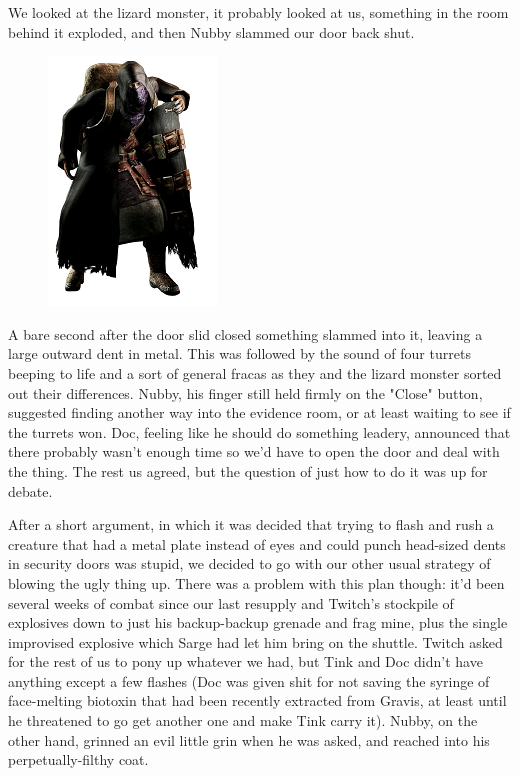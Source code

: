 We looked at the lizard monster, it probably looked at us, something in the room behind it exploded, and then Nubby slammed our door back shut.

\begin{figure}
	\begin{center}
		\includegraphics[width=\figwidth]{pics/16/22.png}
	\end{center}
\end{figure}
A bare second after the door slid closed something slammed into it, leaving a large outward dent in metal. 
This was followed by the sound of four turrets beeping to life and a sort of general fracas as they and the lizard monster sorted out their differences. 
Nubby, his finger still held firmly on the "Close" button, suggested finding another way into the evidence room, or at least waiting to see if the turrets won. 
Doc, feeling like he should do something leadery, announced that there probably wasn't enough time so we'd have to open the door and deal with the thing. 
The rest us agreed, but the question of just how to do it was up for debate.

After a short argument, in which it was decided that trying to flash and rush a creature that had a metal plate instead of eyes and could punch head-sized dents in security doors was stupid, we decided to go with our other usual strategy of blowing the ugly thing up. 
There was a problem with this plan though: 
it'd been several weeks of combat since our last resupply and Twitch's stockpile of explosives down to just his backup-backup grenade and frag mine, plus the single improvised explosive which Sarge had let him bring on the shuttle. 
Twitch asked for the rest of us to pony up whatever we had, but Tink and Doc didn't have anything except a few flashes (Doc was given shit for not saving the syringe of face-melting biotoxin that had been recently extracted from Gravis, at least until he threatened to go get another one and make Tink carry it). 
Nubby, on the other hand, grinned an evil little grin when he was asked, and reached into his perpetually-filthy coat.

